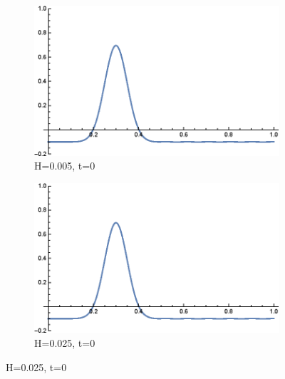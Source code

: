 \documentclass[12pt]{article}
\numberwithin{equation}{section}
\begin{document}
\begin{figure}
    \centering
    \begin{subfigure}[center]{0.42\textwidth}
        \includegraphics[width=\textwidth]{figures/linear-solution/linear-solution-H_0.005_t_0.0.eps}
        \caption{H=0.005, t=0}
    \end{subfigure}
    \hfill
    \begin{subfigure}[center]{0.42\textwidth}
        \includegraphics[width=\textwidth]{figures/linear-solution/linear-solution-H_0.025_t_0.0.eps}
        \caption{H=0.025, t=0}
    \end{subfigure}
    

\end{figure}
\end{document}
